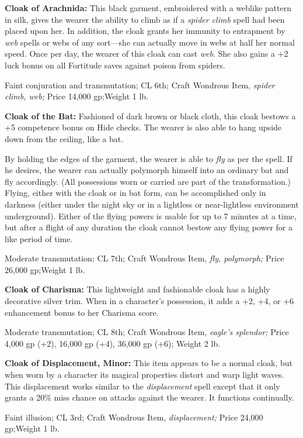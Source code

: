 \documentclass{article}
\begin{document}
\textbf{Cloak of Arachnida:} This black garment, embroidered with a weblike pattern 
in silk, gives the wearer the ability to climb as if a \textit{spider climb }spell 
had been placed upon her. In addition, the cloak grants her immunity to entrapment 
by \textit{web }spells or webs of any sort---she can actually move in webs at half 
her normal speed. Once per day, the wearer of this cloak can cast \textit{web}. 
She also gains a +2 luck bonus on all Fortitude saves against poison from spiders.

Faint conjuration and transmutation; CL 6th; Craft Wondrous Item, \textit{spider 
climb, web; }Price 14,000 gp;Weight 1 lb.

\textbf{Cloak of the Bat:} Fashioned of dark brown or black cloth, this cloak bestows 
a +5 competence bonus on Hide checks. The wearer is also able to hang upside down 
from the ceiling, like a bat.

By holding the edges of the garment, the wearer is able to \textit{fly }as per 
the spell. If he desires, the wearer can actually polymorph himself into an ordinary 
bat and fly accordingly. (All possessions worn or carried are part of the transformation.) 
Flying, either with the cloak or in bat form, can be accomplished only in darkness 
(either under the night sky or in a lightless or near-lightless environment underground). 
Either of the flying powers is usable for up to 7 minutes at a time, but after 
a flight of any duration the cloak cannot bestow any flying power for a like period 
of time.

Moderate transmutation; CL 7th; Craft Wondrous Item, \textit{fly, polymorph; }Price 
26,000 gp;Weight 1 lb.

\textbf{Cloak of Charisma: }This lightweight and fashionable cloak has a highly 
decorative silver trim. When in a character's possession, it adds a +2, +4, or 
+6 enhancement bonus to her Charisma score.

Moderate transmutation; CL 8th; Craft Wondrous Item, \textit{eagle's splendor; 
}Price 4,000 gp (+2), 16,000 gp (+4), 36,000 gp (+6); Weight 2 lb.

\textbf{Cloak of Displacement, Minor:} This item appears to be a normal cloak, 
but when worn by a character its magical properties distort and warp light waves. 
This displacement works similar to the \textit{displacement }spell except that 
it only grants a 20\% miss chance on attacks against the wearer. It functions continually.

Faint illusion; CL 3rd; Craft Wondrous Item, \textit{displacement; }Price 24,000 
gp;Weight 1 lb.
\end{document}

